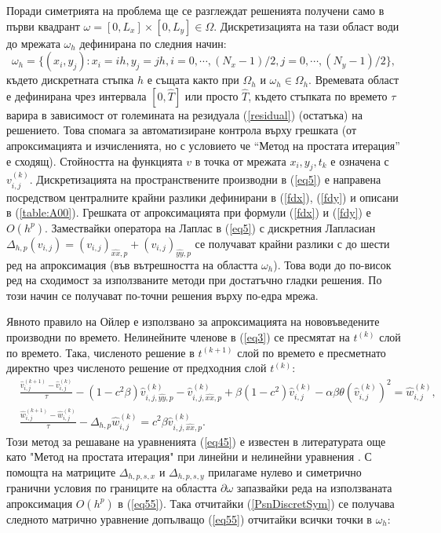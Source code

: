 \documentclass{article}
\newcommand{\rf}[1]{(\ref{#1})}
\theoremstyle{remark}
\begin{document}
Поради симетрията на проблема ще се разглеждат решенията получени само в първи квадрант $\omega = [0,L_x] \times[0,L_y] \in \Omega$. Дискретизацията на тази област води до мрежата $\omega_h$ дефинирана по следния начин:
$$
\omega_h = \{(x_i,y_j): x_i = ih, y_j = jh, i = 0,\cdots ,(N_x-1)/2, j = 0,\cdots , (N_y-1)/2 \},
$$
където дискретната стъпка $h$ е същата както при $\Omega_h$ и $\omega_h \in \Omega_h$. Времевата област е дефинирана чрез интервала $[0, \widehat T]$ или просто $\widehat T$, където стъпката по времето $\tau$ варира в зависимост от големината на резидуала \rf{residual} (остатъка) на решението. Това спомага за автоматизиране контрола върху грешката (от апроксимацията и изчисленията, но с условието че ``Метод на простата итерация'' е сходящ). Стойността на функцията $v$ в точка от мрежата $x_i,y_j,t_k$ е означена с $v_{i,j}^{(k)}$. 
Дискретизацията на пространствените производни в \rf{eq5} е направена посредством централните крайни разлики дефинирани в \rf{fdx}, \rf{fdy} и описани в \rf{table:A00}. Грешката от апроксимацията при формули \rf{fdx} и \rf{fdy} е $O(h^p)$. Замествайки оператора на Лаплас в \rf{eq5} с дискретния Лапласиан $\Delta_{h,p} (v_{i,j}) = (v_{i,j})_{\widehat{xx},p} + (v_{i,j})_{\widehat{yy},p}$ се получават крайни разлики с до шести ред на апроксимация (във вътрешността на областта $\omega_h$). Това води до по-висок ред на сходимост за използваните методи при достатъчно гладки решения. По този начин се получават по-точни решения върху по-едра мрежа. 
\par
Явното правило на Ойлер е използвано за апроксимацията на нововъведените производни по времето. Нелинейните членове в \rf{eq3} се пресмятат на $t^{(k)}$ слой по времето. Така, численото решение в $t^{(k+1)}$ слой по времето е пресметнато директно чрез численото решение от предходния слой $t^{(k)}$:
\begin{equation}\label{eq55}
\begin{split}
&\frac {\widehat{v}_{i,j}^{(k+1)}-\widehat{v}_{i,j}^{(k)}}{\tau}- (1-c^2 \beta) \widehat{v}_{i,j,{\widehat{yy},p}}^{(k)} - \widehat{v}_{i,j,{\widehat{xx},p}}^{(k)} + \beta (1-c^2 ) \widehat{v}_{i,j}^{(k)} - \alpha \beta \theta (\widehat{v}_{i,j}^{(k)})^2 = \widehat{w}_{i,j}^{(k)}, \\
&\frac  {\widehat{w}_{i,j}^{(k+1)} -\widehat{w}_{i,j}^{(k)}} {\tau} - \Delta_{h,p} \widehat{w}_{i,j}^{(k)} =  c^2 \beta \widehat{v}_{i,j,{\widehat{xx},p}}^{(k)}.
\end{split}
\end{equation}
Този метод за решаване на уравненията \rf{eq45} е известен в литературата още като "Метод на простата итерация" при линейни и нелинейни уравнения \cite{sam}. С помощта на матриците $\Delta_{h,p,s,x}$ и $\Delta_{h,p,s,y}$ прилагаме нулево и симетрично гранични условия по границите на областта $\partial \omega$ запазвайки реда на използваната апроксимация $O(h^p)$ в \rf{eq55}. Така отчитайки \rf{PsnDiscretSym} се получава следното матрично уравнение допълващо \rf{eq55} отчитайки всички точки в $\omega_h$:
\end{document}
